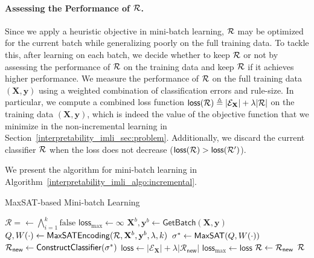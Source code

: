 \paragraph{Assessing  the Performance of $ {\mathcal{R}} $.} Since we apply a heuristic objective in mini-batch learning,  $ {\mathcal{R}} $ may be optimized for the current batch while generalizing poorly on the full training data. To tackle this, after learning on each batch, we decide whether to keep $ {\mathcal{R}} $ or not by assessing the performance of $ {\mathcal{R}} $ on the training data and keep $ {\mathcal{R}} $ if it achieves higher performance. We measure the performance of $ {\mathcal{R}} $ on the full training data $ (\mathbf{X}, \mathbf{y}) $ using a weighted combination of classification errors and rule-size. In particular, we compute a combined loss function $ \mathsf{loss}({\mathcal{R}}) \triangleq |\mathcal{E}_\mathbf{X}| +\lambda |\mathcal{R}| $ on the training data $ (\mathbf{X}, \mathbf{y}) $, which is indeed the value of the objective function that we minimize in the non-incremental learning in Section~\ref{interpretability_imli_sec:problem}. Additionally, we  discard the current classifier $ {\mathcal{R}} $ when the loss does not decrease ($ \mathsf{loss}({\mathcal{R}}) > \mathsf{loss}({\mathcal{R}}') $). 

We present the algorithm for mini-batch learning in Algorithm~\ref{interpretability_imli_algo:incremental}. 
\begin{algorithm}
	\caption{MaxSAT-based Mini-batch Learning}
	\label{interpretability_imli_algo:incremental}
	\begin{algorithmic}[1]
		\State $\mathcal{R} = \leftarrow \bigwedge_{i=1}^k\text{false} $ 
		\State $ \mathsf{loss}_{\max} \leftarrow \infty$ 
		 
		\State $ \mathbf{X}^b, \mathbf{y}^b \leftarrow \mathsf{GetBatch}(\mathbf{X},\mathbf{y}) $
		\State $ Q, W \! \left( \cdot \right) \leftarrow \mathsf{MaxSATEncoding}({\mathcal{R}}, \mathbf{X}^b, \mathbf{y}^b, \lambda, k) $ 
		\State $ \sigma^* \leftarrow \mathsf{MaxSAT}(Q,W \! \left( \cdot \right)) $
		\State $ {\mathcal{R}}_{\mathsf{new}} \leftarrow \mathsf{ConstructClassifier(\sigma^*)} $
		\State $ \mathsf{loss} \leftarrow  |\mathcal{E}_\mathbf{X}| +\lambda |\mathcal{R}_{\mathsf{new}}| $ 
		\State $ \mathsf{loss}_{\max} \leftarrow \mathsf{loss} $
		\State $ {\mathcal{R}} \leftarrow {\mathcal{R}}_{\mathsf{new}} $
		\EndIf
		\EndFor
		\State \Return $ {\mathcal{R}} $
		\EndFunction
	\end{algorithmic}
\end{algorithm} 	

